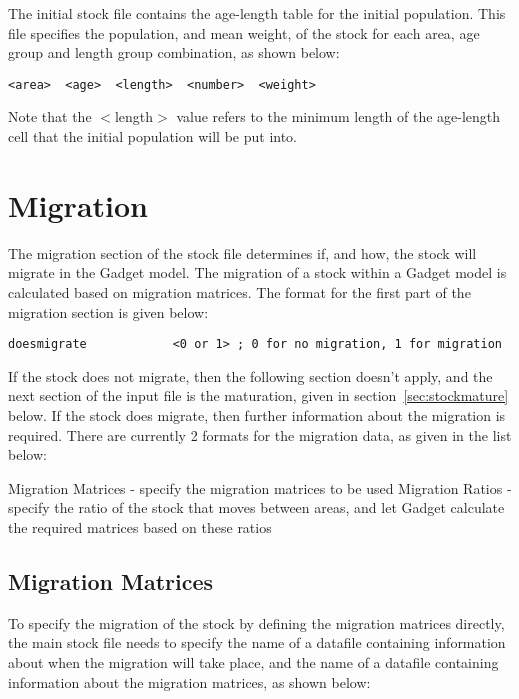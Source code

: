\documentclass[10pt,twoside]{book}
\begin{document}
The initial stock file contains the age-length table for the initial population.  This file specifies the population, and mean weight, of the stock for each area, age group and length group combination, as shown below:

{\small\begin{verbatim}
<area>  <age>  <length>  <number>  <weight>
\end{verbatim}}

Note that the $<$length$>$ value refers to the minimum length of the age-length cell that the initial population will be put into.

\section{Migration}\label{sec:stockmigrate}
The migration section of the stock file determines if, and how, the stock will migrate in the Gadget model.  The migration of a stock within a Gadget model is calculated based on migration matrices.  The format for the first part of the migration section is given below:

{\small\begin{verbatim}
doesmigrate            <0 or 1> ; 0 for no migration, 1 for migration
\end{verbatim}}

If the stock does not migrate, then the following section doesn't apply, and the next section of the input file is the maturation, given in section~\ref{sec:stockmature} below.  If the stock does migrate, then further information about the migration is required.  There are currently 2 formats for the migration data, as given in the list below:

\bigskip
Migration Matrices - specify the migration matrices to be used\newline
Migration Ratios - specify the ratio of the stock that moves between areas, and let Gadget calculate the required matrices based on these ratios

\subsection{Migration Matrices}
To specify the migration of the stock by defining the migration matrices directly, the main stock file needs to specify the name of a datafile containing information about when the migration will take place, and the name of a datafile containing information about the migration matrices, as shown below:
\end{document}
